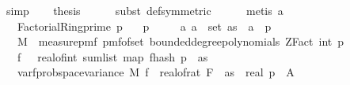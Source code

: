 \begin{isabellebody}
\ simp\isanewline
\isanewline
\ \ \isamarkupfalse%
\ {\isacharquery}{\kern0pt}thesis\isanewline
\ \ \ \ \isamarkupfalse%
\ {\isacharparenleft}{\kern0pt}subst\ {\isasymOmega}{\isacharunderscore}{\kern0pt}def{\isacharbrackleft}{\kern0pt}symmetric{\isacharbrackright}{\kern0pt}{\isacharparenright}{\kern0pt}\isanewline
\ \ \ \ \isamarkupfalse%
\ {\isacharparenleft}{\kern0pt}metis\ a{\isacharparenright}{\kern0pt}\isanewline
{}\isamarkupfalse%
%
\endisatagproof
{\isafoldproof}%
%
\isadelimproof
\isanewline
%
\endisadelimproof
\isanewline
{}\isamarkupfalse%
\ \isanewline
\ \ \ {\isachardoublequoteopen}Factorial{\isacharunderscore}{\kern0pt}Ring{\isachardot}{\kern0pt}prime\ p{\isachardoublequoteclose}\isanewline
\ \ \ {\isachardoublequoteopen}p\ {\isachargreater}{\kern0pt}\ {}{\isachardoublequoteclose}\isanewline
\ \ \ {\isachardoublequoteopen}{\isasymAnd}a{\isachardot}{\kern0pt}\ a\ {\isasymin}\ set\ as\ {\isasymLongrightarrow}\ a\ {\isacharless}{\kern0pt}\ p{\isachardoublequoteclose}\isanewline
\ \ \ {\isachardoublequoteopen}M\ {\isasymequiv}\ measure{\isacharunderscore}{\kern0pt}pmf\ {\isacharparenleft}{\kern0pt}pmf{\isacharunderscore}{\kern0pt}of{\isacharunderscore}{\kern0pt}set\ {\isacharparenleft}{\kern0pt}bounded{\isacharunderscore}{\kern0pt}degree{\isacharunderscore}{\kern0pt}polynomials\ {\isacharparenleft}{\kern0pt}ZFact\ {\isacharparenleft}{\kern0pt}int\ p{\isacharparenright}{\kern0pt}{\isacharparenright}{\kern0pt}\ {}{\isacharparenright}{\kern0pt}{\isacharparenright}{\kern0pt}{\isachardoublequoteclose}\isanewline
\ \ \ {\isachardoublequoteopen}f\ {\isasymequiv}\ {\isacharparenleft}{\kern0pt}{\isasymlambda}{\isasymomega}{\isachardot}{\kern0pt}\ real{\isacharunderscore}{\kern0pt}of{\isacharunderscore}{\kern0pt}int\ {\isacharparenleft}{\kern0pt}sum{\isacharunderscore}{\kern0pt}list\ {\isacharparenleft}{\kern0pt}map\ {\isacharparenleft}{\kern0pt}f{}{\isacharunderscore}{\kern0pt}hash\ p\ {\isasymomega}{\isacharparenright}{\kern0pt}\ as{\isacharparenright}{\kern0pt}{\isacharparenright}{\kern0pt}{\isacharcircum}{\kern0pt}{}{\isacharparenright}{\kern0pt}{\isachardoublequoteclose}\isanewline
\ \ \ var{\isacharunderscore}{\kern0pt}f{}{\isacharcolon}{\kern0pt}{\isachardoublequoteopen}prob{\isacharunderscore}{\kern0pt}space{\isachardot}{\kern0pt}variance\ M\ f\ {\isasymle}\ {}{\isacharasterisk}{\kern0pt}{\isacharparenleft}{\kern0pt}real{\isacharunderscore}{\kern0pt}of{\isacharunderscore}{\kern0pt}rat\ {\isacharparenleft}{\kern0pt}F\ {}\ as{\isacharparenright}{\kern0pt}{\isacharcircum}{\kern0pt}{}{\isacharparenright}{\kern0pt}\ {\isacharasterisk}{\kern0pt}\ {\isacharparenleft}{\kern0pt}{\isacharparenleft}{\kern0pt}real\ p{\isacharparenright}{\kern0pt}\ {\isacharparenleft}{\kern0pt}\ {\isachardoublequoteopen}{\isacharquery}{\kern0pt}A{\isachardoublequoteclose}{\isacharparenright}{\kern0pt}\isanewline

\end{isabellebody}
